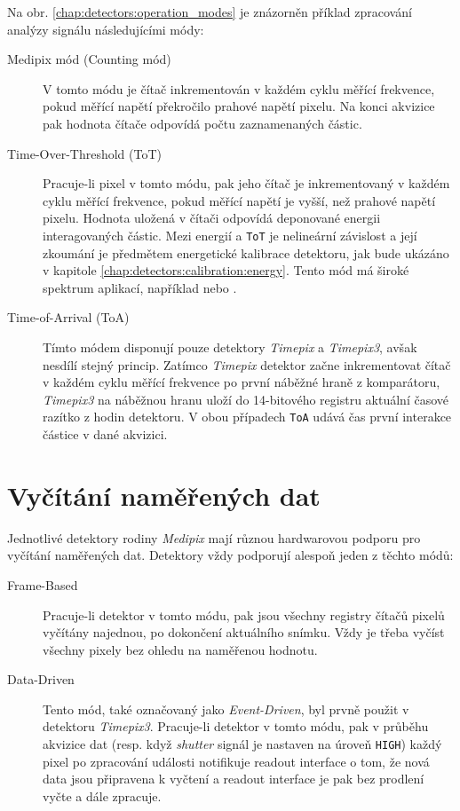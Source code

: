 Na obr. \ref{chap:detectors:operation_modes} je znázorněn příklad zpracování analýzy signálu následujícími módy:
\begin{description}
    \item[Medipix mód (Counting mód)] V tomto módu je čítač inkrementován v každém cyklu měřící frekvence, pokud měřící napětí překročilo prahové napětí pixelu. Na konci akvizice pak hodnota čítače odpovídá počtu zaznamenaných částic.
    \item[Time-Over-Threshold (ToT)] Pracuje-li pixel v tomto módu, pak jeho čítač je inkrementovaný v každém cyklu měřící frekvence, pokud měřící napětí je vyšší, než prahové napětí pixelu. Hodnota uložená v čítači odpovídá deponované energii interagovaných částic. Mezi energií a \texttt{ToT} je nelineární závislost a její zkoumání je předmětem energetické kalibrace detektoru, jak bude ukázáno v kapitole \ref{chap:detectors:calibration:energy}. Tento mód má široké spektrum aplikací, například \cite{tot_app_counting} nebo \cite{tpx_app_radiotherapy}.
    \item[Time-of-Arrival (ToA)] Tímto módem disponují pouze detektory \textit{Timepix} a \textit{Timepix3}, avšak nesdílí stejný princip. Zatímco \textit{Timepix} detektor začne inkrementovat čítač v každém cyklu měřící frekvence po první náběžné hraně z komparátoru, \textit{Timepix3} na náběžnou hranu uloží do 14-bitového registru aktuální časové razítko z hodin detektoru. V obou případech \texttt{ToA} udává čas první interakce částice v dané akvizici.
\end{description}

\section{Vyčítání naměřených dat}\label{chap:detectors:readout}
Jednotlivé detektory rodiny \textit{Medipix} mají různou hardwarovou podporu pro vyčítání naměřených dat. Detektory vždy podporují alespoň jeden z těchto módů:
\begin{description}
	\item[Frame-Based] Pracuje-li detektor v tomto módu, pak jsou všechny registry čítačů pixelů vyčítány najednou, po dokončení aktuálního snímku. Vždy je třeba vyčíst všechny pixely bez ohledu na naměřenou hodnotu.
	\item[Data-Driven] Tento mód, také označovaný jako \textit{Event-Driven}, byl prvně použit v detektoru \textit{Timepix3}. Pracuje-li detektor v tomto módu, pak v průběhu akvizice dat (resp. když \textit{shutter} signál je nastaven na úroveň \texttt{HIGH}) každý pixel po zpracování události notifikuje readout interface o tom, že nová data jsou připravena k vyčtení a readout interface je pak bez prodlení vyčte a dále zpracuje.
\end{description}

